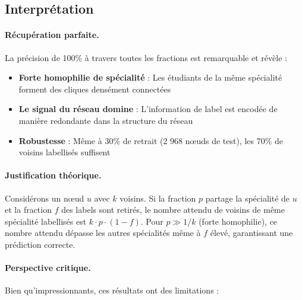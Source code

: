 \documentclass[12pt,a4paper]{article}
\begin{document}
\subsection{Interprétation}

\paragraph{Récupération parfaite.} La précision de 100\% à travers toutes les fractions est remarquable et révèle :

\begin{itemize}
    \item \textbf{Forte homophilie de spécialité} : Les étudiants de la même spécialité forment des cliques densément connectées
    \item \textbf{Le signal du réseau domine} : L'information de label est encodée de manière redondante dans la structure du réseau
    \item \textbf{Robustesse} : Même à 30\% de retrait (2 968 nœuds de test), les 70\% de voisins labellisés suffisent
\end{itemize}

\paragraph{Justification théorique.} Considérons un nœud $u$ avec $k$ voisins. Si la fraction $p$ partage la spécialité de $u$ et la fraction $f$ des labels sont retirés, le nombre attendu de voisins de même spécialité labellisés est $k \cdot p \cdot (1-f)$. Pour $p \gg 1/k$ (forte homophilie), ce nombre attendu dépasse les autres spécialités même à $f$ élevé, garantissant une prédiction correcte.

\paragraph{Perspective critique.} Bien qu'impressionnants, ces résultats ont des limitations :
\end{document}
